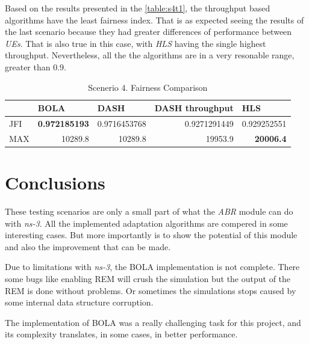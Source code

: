 Based on the results presented in the \autoref{table:s4t1}, the throughput based algorithms 
have the least fairness index. That is as expected seeing the results of the last scenario
because they had greater differences of performance between \textit{UEs}. That is also true in
this case, with \textit{HLS} having the single highest throughput. Nevertheless, all the
the algorithms are in a very resonable range, greater than 0.9.

\begin{table}[h]
    \centering
    \begin{tabular}{@{}lrrrr@{}}
    \toprule
        & \multicolumn{1}{l}{BOLA} & \multicolumn{1}{l}{DASH} & \multicolumn{1}{l}{DASH throughput} & \multicolumn{1}{l}{HLS} \\ \midrule
    JFI & \textbf{0.972185193}     & 0.9716453768             & 0.9271291449                        & 0.929252551             \\
    MAX & 10289.8                  & 10289.8                  & 19953.9                             & \textbf{20006.4}        \\ \bottomrule
    \end{tabular}
    \caption{Scenerio 4. Fairness Comparison}
    \label{table:s4t1}
\end{table}

\section{Conclusions}
\label{sec:simconclu}

These testing scenarios are only a small part of what the \textit{ABR} module can do with \textit{ns-3}.
All the implemented adaptation algorithms are compered in some interesting cases. But more importantly
is to show the potential of this module and also the improvement that can be made. 

Due to limitations with \textit{ns-3}, the BOLA implementation is not complete. There some 
bugs like enabling REM will crush the simulation but the output of the REM is done without
problems. Or sometimes the simulations stops caused by some internal data structure corruption.

The implementation of BOLA was a really challenging task for this project, and its complexity 
translates, in some cases, in better performance.